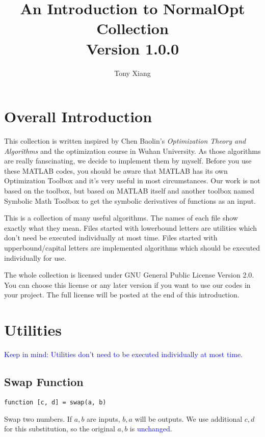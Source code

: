 \documentclass{article}
\title{An Introduction to NormalOpt Collection \\ Version 1.0.0}
\author{Tony Xiang}
\begin{document}
\maketitle
\tableofcontents

\newpage

\section{Overall Introduction}
This collection is written inspired by Chen Baolin's \textit{Optimization Theory and Algorithms} and the optimization course in Wuhan University. As those algorithms are really fanscinating, we decide to implement them by myself. Before you use these MATLAB codes, you should be aware that MATLAB has its own Optimization Toolbox and it's very useful in most circumstances. Our work is not based on the toolbox, but based on MATLAB itself and another toolbox named Symbolic Math Toolbox to get the symbolic derivatives of functions as an input.

This is a collection of many useful algorithms. The names of each file show exactly what they mean. Files started with lowerbound letters are utilities which don't need be executed individually at most time. Files started with upperbound/capital letters are implemented algorithms which should be executed individually for use.

The whole collection is licensed under GNU General Public License Version 2.0. You can choose this license or any later version if you want to use our codes in your project. The full license will be posted at the end of this introduction.

\section{Utilities}
\textcolor{blue}{Keep in mind: Utilities don't need to be executed individually at most time.}

\subsection{Swap Function}
\begin{verbatim}
function [c, d] = swap(a, b)
\end{verbatim}

Swap two numbers. If $a, b$ are inputs, $b, a$ will be outputs. We use additional $c, d$ for this substitution, so the original $a, b$ is \textcolor{blue}{unchanged}.
\end{document}
